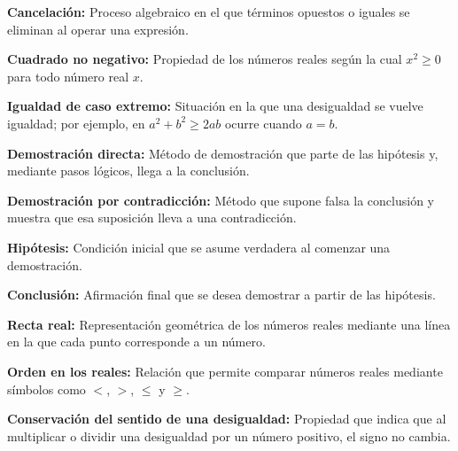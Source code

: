 \documentclass[12pt,final]{report}
\theoremstyle{plain}
\theoremstyle{definition}
\begin{document}
\textbf{Cancelación:} Proceso algebraico en el que términos opuestos o iguales se eliminan al operar una expresión.

\vspace{0.5em}

\textbf{Cuadrado no negativo:} Propiedad de los números reales según la cual $x^2\geq 0$ para todo número real $x$.

\vspace{0.5em}

\textbf{Igualdad de caso extremo:} Situación en la que una desigualdad se vuelve igualdad; por ejemplo, en $a^2+b^2\geq 2ab$ ocurre cuando $a=b$.

\vspace{0.5em}

\textbf{Demostración directa:} Método de demostración que parte de las hipótesis y, mediante pasos lógicos, llega a la conclusión.

\vspace{0.5em}

\textbf{Demostración por contradicción:} Método que supone falsa la conclusión y muestra que esa suposición lleva a una contradicción.

\vspace{0.5em}

\textbf{Hipótesis:} Condición inicial que se asume verdadera al comenzar una demostración.

\vspace{0.5em}

\textbf{Conclusión:} Afirmación final que se desea demostrar a partir de las hipótesis.

\vspace{0.5em}

\textbf{Recta real:} Representación geométrica de los números reales mediante una línea en la que cada punto corresponde a un número.

\vspace{0.5em}

\textbf{Orden en los reales:} Relación que permite comparar números reales mediante símbolos como $<$, $>$, $\leq$ y $\geq$.

\vspace{0.5em}

\textbf{Conservación del sentido de una desigualdad:} Propiedad que indica que al multiplicar o dividir una desigualdad por un número positivo, el signo no cambia.



\end{document}
